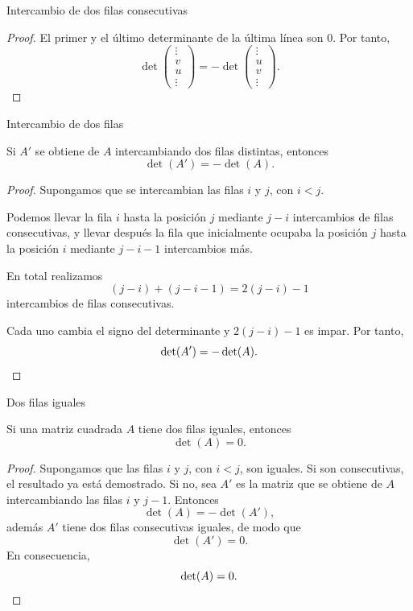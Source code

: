 \begin{frame}[allowframebreaks, t]{Intercambio de dos filas consecutivas}
\begin{proof}
El primer y el último determinante de la última línea son \(0\). Por tanto,
\[
\det
\left(
\begin{array}{c}
\vdots\\
\hline
v\\
u\\
\hline
\vdots
\end{array}
\right)
=
-
\det
\left(
\begin{array}{c}
\vdots\\
\hline
u\\
v\\
\hline
\vdots
\end{array}
\right).
\]
\end{proof}

\end{frame}

\begin{frame}{Intercambio de dos filas}

\begin{corollary}
Si \(A'\) se obtiene de \(A\) intercambiando dos filas distintas,
entonces
\[
\det(A')=-\det(A).
\]
\end{corollary}

\vspace{-15pt}

\begin{proof}
Supongamos que se intercambian las filas \(i\) y \(j\), con \(i<j\).

Podemos llevar la fila \(i\) hasta la posición \(j\) mediante
\(j-i\) intercambios de filas consecutivas, y llevar después la fila
que inicialmente ocupaba la posición \(j\) hasta la posición \(i\)
mediante \(j-i-1\) intercambios más.

En total realizamos
\[
(j-i)+(j-i-1)=2(j-i)-1
\]
intercambios de filas consecutivas.

Cada uno cambia el signo del determinante y \(2(j-i)-1\) es impar.
Por tanto,
\[
\det(A')=-\det(A).\qedhere
\]
\end{proof}

\end{frame}

\begin{frame}{Dos filas iguales}

\begin{corollary}
Si una matriz cuadrada $A$ tiene dos filas iguales, entonces
\[
\det(A)=0.
\]
\end{corollary}

\vspace{-15pt}

\begin{proof}
Supongamos que las filas \(i\) y \(j\), con \(i<j\), son iguales. 
Si son consecutivas, el resultado ya está demostrado. Si no, sea
\(A'\) es la matriz que se obtiene de \(A\) intercambiando las filas \(i\) y \(j-1\). Entonces
\[\det(A)=-\det(A'),\]
además \(A'\) tiene dos filas consecutivas iguales, de modo que
\[\det(A')=0.
\]
En consecuencia,
\[\det(A)=0.\qedhere
\]
\end{proof}

\end{frame}

